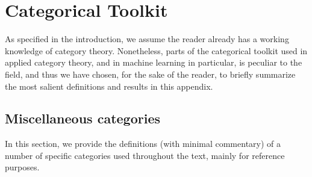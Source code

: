 \documentclass[11pt,a4paper,openright,twoside]{report}
\theoremstyle{plain}
\theoremstyle{definition}
\begin{document}













{\footnotesize }



\clearpage{\pagestyle{empty}\cleardoublepage}




\appendix
\chapter{Categorical Toolkit}



As specified in the introduction, we assume the reader already has a working knowledge of category theory. Nonetheless, parts of the categorical toolkit used in applied category theory, and in machine learning in particular, is peculiar to the field, and thus we have chosen, for the sake of the reader, to briefly summarize the most salient definitions and results in this appendix.




\section{Miscellaneous categories}

In this section, we provide the definitions (with minimal commentary) of a number of specific categories used throughout the text, mainly for reference purposes.
\end{document}
